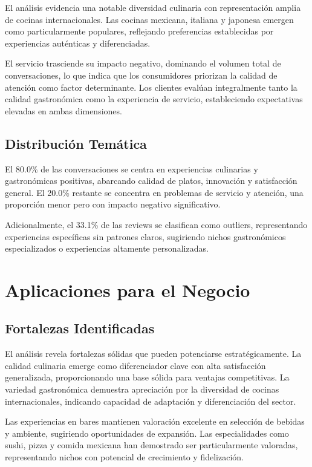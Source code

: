 \documentclass[12pt,a4paper,twoside,openany]{book}
\begin{document}
El análisis evidencia una notable diversidad culinaria con representación amplia de cocinas internacionales. Las cocinas mexicana, italiana y japonesa emergen como particularmente populares, reflejando preferencias establecidas por experiencias auténticas y diferenciadas.

El servicio trasciende su impacto negativo, dominando el volumen total de conversaciones, lo que indica que los consumidores priorizan la calidad de atención como factor determinante. Los clientes evalúan integralmente tanto la calidad gastronómica como la experiencia de servicio, estableciendo expectativas elevadas en ambas dimensiones.

\subsection{Distribución Temática}

El 80.0\% de las conversaciones se centra en experiencias culinarias y gastronómicas positivas, abarcando calidad de platos, innovación y satisfacción general. El 20.0\% restante se concentra en problemas de servicio y atención, una proporción menor pero con impacto negativo significativo.

Adicionalmente, el 33.1\% de las reviews se clasifican como outliers, representando experiencias específicas sin patrones claros, sugiriendo nichos gastronómicos especializados o experiencias altamente personalizadas.

\section{Aplicaciones para el Negocio}

\subsection{Fortalezas Identificadas}

El análisis revela fortalezas sólidas que pueden potenciarse estratégicamente. La calidad culinaria emerge como diferenciador clave con alta satisfacción generalizada, proporcionando una base sólida para ventajas competitivas. La variedad gastronómica demuestra apreciación por la diversidad de cocinas internacionales, indicando capacidad de adaptación y diferenciación del sector.

Las experiencias en bares mantienen valoración excelente en selección de bebidas y ambiente, sugiriendo oportunidades de expansión. Las especialidades como sushi, pizza y comida mexicana han demostrado ser particularmente valoradas, representando nichos con potencial de crecimiento y fidelización.
\end{document}
